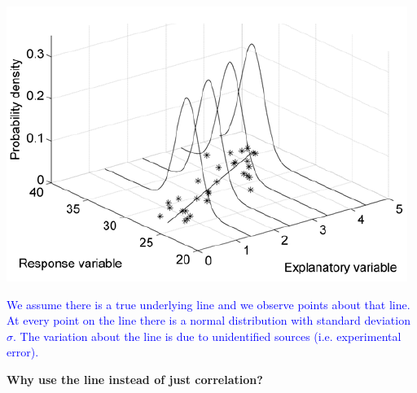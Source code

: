 \begin{center}
\includegraphics[scale=0.7]{regnorm}
\end{center}
\textcolor{blue}{We assume there is a true underlying line and we observe points about that line.  At every point on the line there is a normal distribution with standard deviation $\sigma$.  The variation about the line is due to unidentified sources (i.e. experimental error).}

\newpage

\textbf{Why use the line instead of just correlation?}\\~\\~\\~\\~\\~\\

